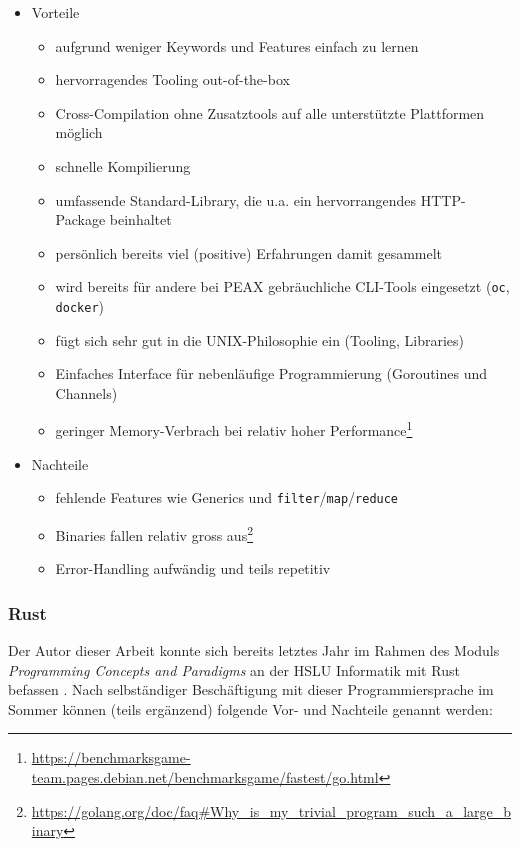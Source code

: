 \begin{itemize}
	\item Vorteile
		\begin{itemize}
			\item aufgrund weniger Keywords und Features einfach zu lernen
			\item hervorragendes Tooling out-of-the-box
			\item Cross-Compilation ohne Zusatztools auf alle unterstützte Plattformen möglich
			\item schnelle Kompilierung
			\item umfassende Standard-Library, die u.a. ein hervorrangendes HTTP-Package beinhaltet
			\item persönlich bereits viel (positive) Erfahrungen damit gesammelt
			\item wird bereits für andere bei PEAX gebräuchliche CLI-Tools eingesetzt (\texttt{oc}, \texttt{docker})
			\item fügt sich sehr gut in die UNIX-Philosophie ein (Tooling, Libraries)
			\item Einfaches Interface für nebenläufige Programmierung (Goroutines und Channels)
			\item geringer Memory-Verbrach bei relativ hoher Performance\footnote{\url{https://benchmarksgame-team.pages.debian.net/benchmarksgame/fastest/go.html}}
		\end{itemize}
	\item Nachteile
		\begin{itemize}
			\item fehlende Features wie Generics und \texttt{filter}/\texttt{map}/\texttt{reduce}
			\item Binaries fallen relativ gross aus\footnote{\url{https://golang.org/doc/faq\#Why\_is\_my\_trivial\_program\_such\_a\_large\_binary}}
			\item Error-Handling aufwändig und teils repetitiv
		\end{itemize}
\end{itemize}

\subsubsection{Rust}

Der Autor dieser Arbeit konnte sich bereits letztes Jahr im Rahmen des Moduls \textit{Programming Concepts and Paradigms} an der HSLU Informatik mit Rust befassen \cite[p. 12]{pcp-rust}. Nach selbständiger Beschäftigung mit dieser Programmiersprache im Sommer können (teils ergänzend) folgende Vor- und Nachteile genannt werden:

